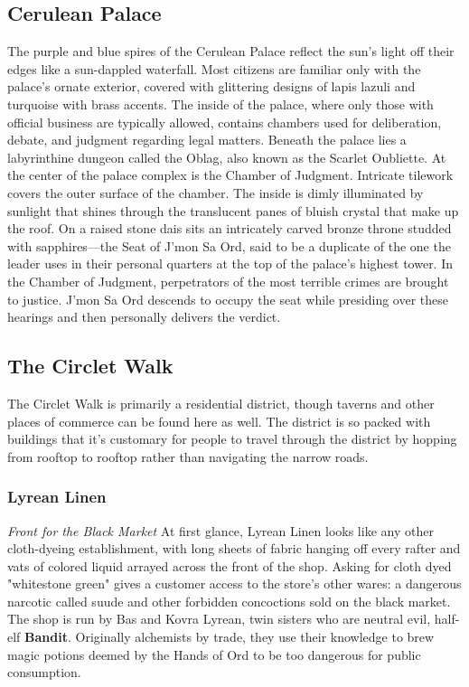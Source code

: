\documentclass[10pt,a4,twoside,twocolumn,openany,nodeprecatedcode]{dndbook}
\begin{document}
\subsection{Cerulean Palace}
The purple and blue spires of the Cerulean Palace reflect the sun's light off their edges like a sun-dappled waterfall. Most citizens are familiar only with the palace's ornate exterior, covered with glittering designs of lapis lazuli and turquoise with brass accents. The inside of the palace, where only those with official business are typically allowed, contains chambers used for deliberation, debate, and judgment regarding legal matters. Beneath the palace lies a labyrinthine dungeon called the Oblag, also known as the Scarlet Oubliette.
At the center of the palace complex is the Chamber of Judgment. Intricate tilework covers the outer surface of the chamber. The inside is dimly illuminated by sunlight that shines through the translucent panes of bluish crystal that make up the roof. On a raised stone dais sits an intricately carved bronze throne studded with sapphires—the Seat of J'mon Sa Ord, said to be a duplicate of the one the leader uses in their personal quarters at the top of the palace's highest tower. In the Chamber of Judgment, perpetrators of the most terrible crimes are brought to justice. J'mon Sa Ord descends to occupy the seat while presiding over these hearings and then personally delivers the verdict.
\subsection{The Circlet Walk}
The Circlet Walk is primarily a residential district, though taverns and other places of commerce can be found here as well. The district is so packed with buildings that it's customary for people to travel through the district by hopping from rooftop to rooftop rather than navigating the narrow roads.
\subsubsection{Lyrean Linen}
\textit{Front for the Black Market}
At first glance, Lyrean Linen looks like any other cloth-dyeing establishment, with long sheets of fabric hanging off every rafter and vats of colored liquid arrayed across the front of the shop. Asking for cloth dyed "whitestone green" gives a customer access to the store's other wares: a dangerous narcotic called suude and other forbidden concoctions sold on the black market.
The shop is run by Bas and Kovra Lyrean, twin sisters who are neutral evil, half-elf \textbf{Bandit}. Originally alchemists by trade, they use their knowledge to brew magic potions deemed by the Hands of Ord to be too dangerous for public consumption.
\end{document}
